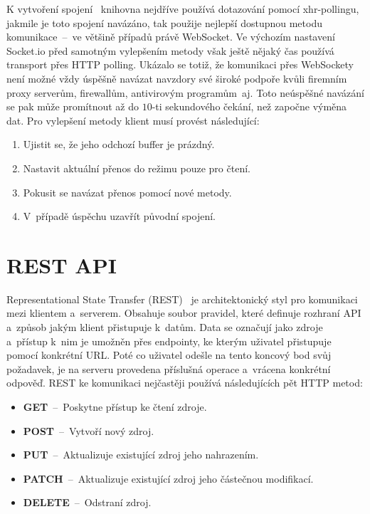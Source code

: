 K vytvoření spojení~\cite{manual:SocketIO} knihovna nejdříve používá dotazování pomocí xhr-pollingu, jakmile je toto spojení navázáno, tak použije nejlepší dostupnou metodu komunikace~--~ve většině případů právě WebSocket. Ve výchozím nastavení Socket.io před samotným vylepšením metody však ještě nějaký čas používá transport přes HTTP polling. Ukázalo se totiž, že komunikaci přes WebSockety není možné vždy úspěšně navázat navzdory své široké podpoře kvůli firemním proxy serverům, firewallům, antivirovým programům~aj. Toto neúspěšné navázání se pak může promítnout až do $10$-ti sekundového čekání, než započne výměna dat. Pro vylepšení metody klient musí provést následující:
\begin{enumerate}
    \item Ujistit se, že jeho odchozí buffer je prázdný.
    \item Nastavit aktuální přenos do režimu pouze pro čtení.
    \item Pokusit se navázat přenos pomocí nové metody.
    \item V~případě úspěchu uzavřít původní spojení.
\end{enumerate}

\section{REST API}
Representational State Transfer (REST)~\cite{website:REST} je architektonický styl pro komunikaci mezi klientem a~serverem. Obsahuje soubor pravidel, které definuje rozhraní API a~způsob jakým klient přistupuje k~datům. Data se označují jako zdroje a~přístup k~nim je umožněn přes endpointy, ke kterým uživatel přistupuje pomocí konkrétní URL. Poté co uživatel odešle na tento koncový bod svůj požadavek, je na serveru provedena příslušná operace a~vrácena konkrétní odpověď. REST ke komunikaci nejčastěji používá následujících pět HTTP metod:
\begin{itemize}
    \item \textbf{GET}~--~Poskytne přístup ke čtení zdroje.
    \item \textbf{POST}~--~Vytvoří nový zdroj.
    \item \textbf{PUT}~--~Aktualizuje existující zdroj jeho nahrazením.
    \item \textbf{PATCH}~--~Aktualizuje existující zdroj jeho částečnou modifikací.
    \item \textbf{DELETE}~--~Odstraní zdroj.
\end{itemize}

